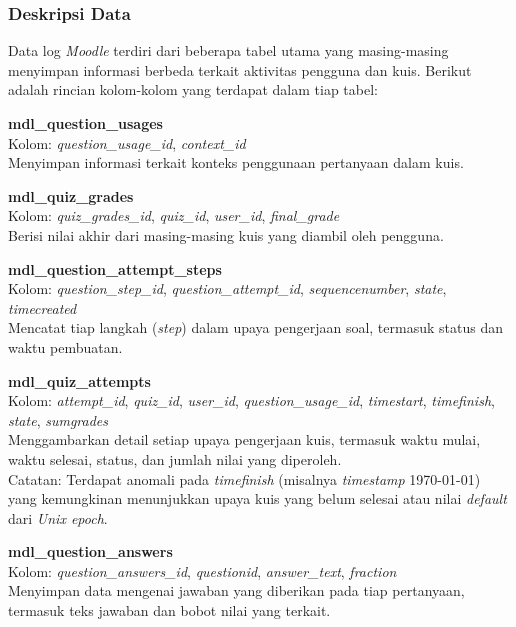 \subsubsection{Deskripsi Data}
\label{sec:deskripsiData}
Data log \textit{Moodle} terdiri dari beberapa tabel utama yang masing-masing menyimpan informasi berbeda terkait aktivitas pengguna dan kuis. Berikut adalah rincian kolom-kolom yang terdapat dalam tiap tabel:

\textbf{mdl\_question\_usages} \\
Kolom: \textit{question\_usage\_id}, \textit{context\_id} \\
Menyimpan informasi terkait konteks penggunaan pertanyaan dalam kuis.

\textbf{mdl\_quiz\_grades} \\
Kolom: \textit{quiz\_grades\_id}, \textit{quiz\_id}, \textit{user\_id}, \textit{final\_grade} \\
Berisi nilai akhir dari masing-masing kuis yang diambil oleh pengguna.

\textbf{mdl\_question\_attempt\_steps} \\
Kolom: \textit{question\_step\_id}, \textit{question\_attempt\_id}, \textit{sequencenumber}, \textit{state}, \textit{timecreated} \\
Mencatat tiap langkah (\textit{step}) dalam upaya pengerjaan soal, termasuk status dan waktu pembuatan.

\textbf{mdl\_quiz\_attempts} \\
Kolom: \textit{attempt\_id}, \textit{quiz\_id}, \textit{user\_id}, \textit{question\_usage\_id}, \textit{timestart}, \textit{timefinish}, \textit{state}, \textit{sumgrades} \\
Menggambarkan detail setiap upaya pengerjaan kuis, termasuk waktu mulai, waktu selesai, status, dan jumlah nilai yang diperoleh. \\
Catatan: Terdapat anomali pada \textit{timefinish} (misalnya \textit{timestamp} 1970-01-01) yang kemungkinan menunjukkan upaya kuis yang belum selesai atau nilai \textit{default} dari \textit{Unix epoch}.

\textbf{mdl\_question\_answers} \\
Kolom: \textit{question\_answers\_id}, \textit{questionid}, \textit{answer\_text}, \textit{fraction} \\
Menyimpan data mengenai jawaban yang diberikan pada tiap pertanyaan, termasuk teks jawaban dan bobot nilai yang terkait.

